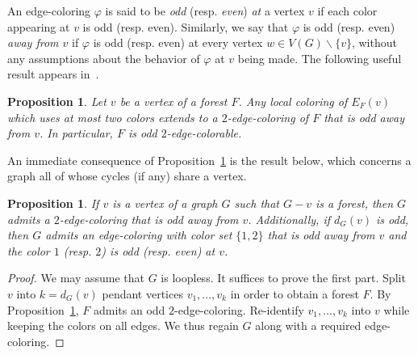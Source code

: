 \documentclass[a4paper,12pt]{article}
\newtheorem{proposition}[theorem]{Proposition}
\numberwithin{equation}{section}
\begin{document}
\smallskip

 An edge-coloring $\varphi$ is said to be \textit{odd} (resp. \textit{even}) \textit{at} a vertex $v$ if each color appearing  at $v$ is odd (resp. even). Similarly, we say that $\varphi$ is odd (resp. even) \textit{away from $v$} if $\varphi$ is odd (resp. even) at every vertex $w\in V(G)\backslash\{v\}$, without any assumptions about the behavior of $\varphi$ at $v$ being made.
The following useful result appears in~\cite{Mat06,Pet18}.

\begin{proposition}
    \label{forest}
    Let $v$ be a vertex of a forest $F$. Any local coloring of $E_F(v)$ which uses at most two colors extends to a $2$-edge-coloring of $F$ that is odd away from $v$. In particular, $F$ is odd $2$-edge-colorable.
\end{proposition}


An immediate consequence of Proposition~\ref{forest} is the result below, which concerns a graph all of whose cycles (if any) share a vertex.
 \begin{proposition}
    \label{consequences:forest}
    If $v$ is a vertex of a graph $G$ such that $G-v$ is a forest, then $G$ admits a $2$-edge-coloring that is odd away from $v$. Additionally, if $d_G(v)$ is odd, then $G$ admits an edge-coloring with color set $\{1,2\}$ that is odd away from $v$ and the color $1$ (resp. $2$) is odd (resp. even) at $v$.
 \end{proposition}

 \begin{proof}
 We may assume that $G$ is loopless. It suffices to prove the first part. Split $v$ into $k=d_G(v)$ pendant vertices $v_1,\ldots,v_k$ in order to obtain a forest $F$. By Proposition~\ref{forest}, $F$ admits an odd $2$-edge-coloring. Re-identify $v_1,\ldots,v_k$ into $v$ while keeping the colors on all edges. We thus regain $G$ along with a required edge-coloring.
 \end{proof}
\end{document}
